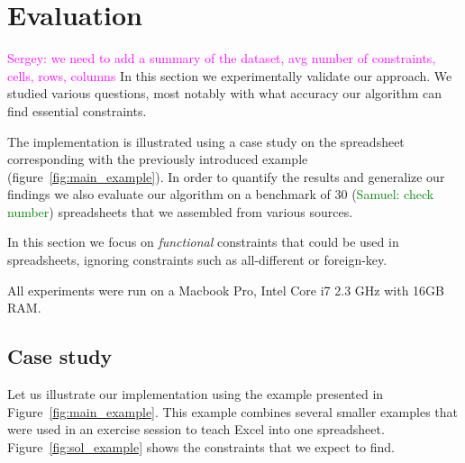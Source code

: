 \documentclass{ecai}
\newcommand{\sergey}[1]{\textcolor{magenta}{{\sc Sergey:} #1}\xspace}
\newcommand{\samuel}[1]{\textcolor{green}{{\sc Samuel:} #1}\xspace}
\begin{document}

\section{Evaluation}
\sergey{we need to add a summary of the dataset, avg number of constraints, cells, rows, columns}
In this section we experimentally validate our approach.
We studied various questions, most notably with what accuracy our algorithm can find essential constraints.

The implementation is illustrated using a case study on the spreadsheet corresponding with the previously introduced example (figure~\ref{fig:main_example}).
In order to quantify the results and generalize our findings we also evaluate our algorithm on a benchmark of 30 (\samuel{check number}) spreadsheets that we assembled from various sources.

In this section we focus on \textit{functional} constraints that could be used in spreadsheets, ignoring constraints such as all-different or foreign-key.

All experiments were run on a Macbook Pro, Intel Core i7 2.3 GHz with 16GB RAM.

\subsection{Case study}
Let us illustrate our implementation using the example presented in Figure~\ref{fig:main_example}.
This example combines several smaller examples that were used in an exercise session to teach Excel into one spreadsheet.
Figure~\ref{fig:sol_example} shows the constraints that we expect to find.
\end{document}
